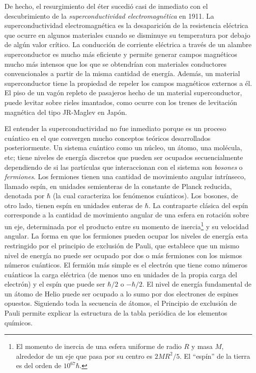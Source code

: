 De hecho, el resurgimiento del éter sucedió casi de inmediato con el descubrimiento de la \emph{superconductividad electromagnética} en 1911. La superconductividad electromagnética es la desaparición de la resistencia eléctrica que ocurre en algunos materiales cuando se disminuye su temperatura por debajo de algún valor crítico. La conducción de corriente eléctrica a través de un alambre superconductor es mucho más eficiente y permite generar campos magnéticos mucho más intensos que los que se obtendrían con materiales conductores convencionales a partir de  la misma cantidad de energía. Además, un material superconductor tiene la propiedad de repeler los campos magnéticos externos a él. El piso de un vagón repleto de pasajeros hecho de un material superconductor, puede levitar sobre rieles imantados, como ocurre con los trenes de levitación magnética del tipo JR-Maglev en Japón.

El entender la superconductividad no fue inmediato porque es un proceso cuántico en el que convergen mucho conceptos teóricos desarrollados posteriormente. Un sistema cuántico como un núcleo, un átomo, una molécula, etc; tiene niveles de energía discretos que pueden ser ocupados secuencialmente dependiendo de si las partículas que interaccionan con el sistema son \emph{bosones} o \emph{fermiones}.  Los fermiones tienen una cantidad de movimiento angular intrínseco, llamado espín, en unidades semienteras de la constante de Planck reducida, denotada por $\hbar$ (la cual caracteriza los fenómenos cuánticos). Los bosones, de otro lado, tienen espín en unidades enteras de $\hbar$. La contraparte clásica del espín corresponde a la cantidad de movimiento angular de una esfera en rotación sobre un eje, determinada por el producto entre su momento de inercia\footnote{El momento de inercia de una esfera uniforme de radio $R$ y masa $M$, alrededor de un eje que pasa por su centro es $2MR^2/5$. El ``espín'' de la tierra es del orden de $10^{67}\hbar$.} y su velocidad angular. La forma en que los fermiones pueden ocupar los niveles de energía esta restringido por el principio de exclusión de Pauli, que establece que un mismo nivel de energía no puede ser ocupado por dos o más fermiones con los mismos números cuánticos. El fermión más simple es el electrón que tiene como números cuánticos la carga eléctrica (de menos uno en unidades de la propia carga del electrón) y el espín que puede ser $\hbar/2$ o $-\hbar/2$. El nivel de energía fundamental de un átomo de Helio puede ser ocupado a lo sumo por dos electrones de espines opuestos. Siguiendo toda la secuencia de átomos,  el Principio de exclusión de Pauli permite explicar la estructura de la tabla periódica de los elementos químicos. 

